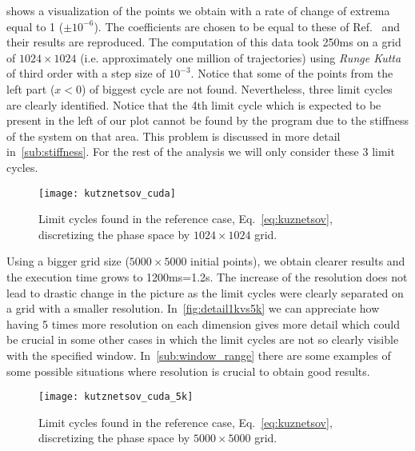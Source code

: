 \pagebreak
{} shows a visualization of the points we obtain with a
rate of change of extrema equal to 1 ($\pm 10^{-6}$).
The coefficients are chosen to be equal to these of Ref.~\cite{kuznetsov_visualization_2013} and their results are reproduced. The computation of this data took 250ms on a grid of $1024 \times 1024$ (i.e. approximately one million of trajectories) using \emph{Runge Kutta} of third order with a step size of $10^{-3}$.
Notice that some of the points from the left part ($x < 0$) of biggest cycle are not found.
Nevertheless, three limit cycles are clearly identified. Notice that the
4th limit cycle which is expected to be present in the left of our plot cannot be found by the program due to the stiffness of the system on that area. This problem is discussed in more detail in~\cref{sub:stiffness}. For the rest of the analysis we will only consider these 3 limit cycles.
\begin{figure}[H]
    \centering
    \texttt{[image: kutznetsov\_cuda]}
    \caption{Limit cycles found in the reference case, Eq.~\ref{eq:kuznetsov}, discretizing the phase space by $1024\times 1024$ grid.
    }
    \label{fig:kuznetsov_cuda}
\end{figure}

Using a bigger grid size ($5000\times5000$ initial points), we obtain clearer results and the execution time grows to 1200ms=1.2s.
The increase of the resolution does not lead to drastic change in the picture as
the limit cycles were clearly separated on a grid with a smaller resolution.
In~\cref{fig:detail1kvs5k} we can appreciate how having 5 times more resolution on each dimension
gives more detail which could be crucial
in some other cases in which the limit cycles are not so clearly visible with the specified window.
In~\cref{sub:window_range} there are some examples of some possible situations where resolution is crucial to obtain good results.

\begin{figure}[H]
\centering
\texttt{[image: kutznetsov\_cuda\_5k]}
\caption{Limit cycles found in the reference case, Eq.~\ref{eq:kuznetsov}, discretizing the phase space by $5000\times 5000$ grid.
}
\label{fig:kuznetsov_cuda_5k}
\end{figure}

